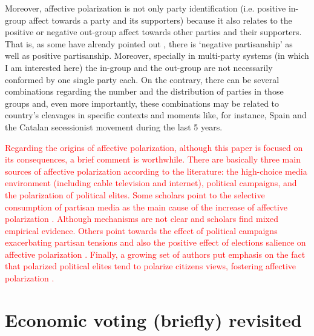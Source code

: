 \documentclass[a4paper, svgnames]{article}
\begin{document}
Moreover, affective polarization is not only party identification (i.e. positive in-group affect towards a party and its supporters) because it also relates to the positive or negative out-group affect towards other parties and their supporters. That is, as some have already pointed out \citep{Medeiros2013, Abramowitz2016}, there is `negative partisanship' as well as positive partisanship. Moreover, specially in multi-party systems (in which I am interested here) the in-group and the out-group are not necessarily conformed by one single party each. On the contrary, there can be several combinations regarding the number and the distribution of parties in those groups and, even more importantly, these combinations may be related to country's cleavages in specific contexts and moments like, for instance, Spain and the Catalan secessionist movement during the last 5 years.

\textcolor{red}{Regarding the origins of affective polarization, although this paper is focused on its consequences, a brief comment is worthwhile. There are basically three main sources of affective polarization according to the literature: the high-choice media environment (including cable television and internet), political campaigns, and the polarization of political elites. Some scholars point to the selective consumption of partisan media as the main cause of the increase of affective polarization \citep{Garrett2014, Lelkes2017}. Although mechanisms are not clear and scholars find mixed empirical evidence. Others point towards the effect of political campaigns exacerbating partisan tensions \citep{Sood} and also the positive effect of elections salience on affective polarization \citep{Hernandez2021}. Finally, a growing set of authors put emphasis on the fact that polarized political elites tend to polarize citizens views, fostering affective polarization \citep{Druckman2013, Gidron2018, Rodriguez-Teruel2021}.}



\section{Economic voting (briefly) revisited}
\end{document}
